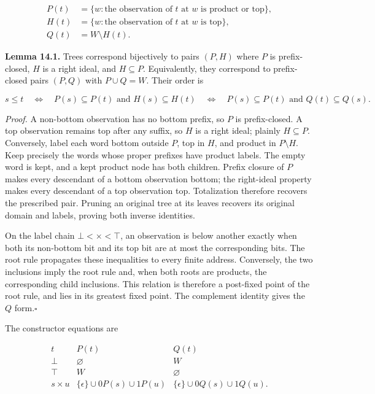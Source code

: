 \documentclass[
  11pt,
  a4paper,
]{article}
\begin{document}
\[\begin{aligned}
P(t)&=\{w:\text{the observation of }t\text{ at }w\text{ is product or top}\},\\
H(t)&=\{w:\text{the observation of }t\text{ at }w\text{ is top}\},\\
Q(t)&=W\setminus H(t).
\end{aligned}\]


\textbf{Lemma 14.1.} Trees correspond bijectively to pairs \((P,H)\)
where \(P\) is prefix-closed, \(H\) is a right ideal, and
\(H\subseteq P\). Equivalently, they correspond to prefix-closed pairs
\((P,Q)\) with \(P\cup Q=W\). Their order is

\[s\le t\quad\Longleftrightarrow\quad
P(s)\subseteq P(t)\text{ and }H(s)\subseteq H(t)
\quad\Longleftrightarrow\quad
P(s)\subseteq P(t)\text{ and }Q(t)\subseteq Q(s). \tag{14.1}\]

\emph{Proof.} A non-bottom observation has no bottom prefix, so \(P\) is
prefix-closed. A top observation remains top after any suffix, so \(H\)
is a right ideal; plainly \(H\subseteq P\). Conversely, label each word
bottom outside \(P\), top in \(H\), and product in \(P\setminus H\).
Keep precisely the words whose proper prefixes have product labels. The
empty word is kept, and a kept product node has both children. Prefix
closure of \(P\) makes every descendant of a bottom observation bottom;
the right-ideal property makes every descendant of a top observation
top. Totalization therefore recovers the prescribed pair. Pruning an
original tree at its leaves recovers its original domain and labels,
proving both inverse identities.

On the label chain \(\bot<\times<\top\), an observation is below another
exactly when both its non-bottom bit and its top bit are at most the
corresponding bits. The root rule propagates these inequalities to every
finite address. Conversely, the two inclusions imply the root rule and,
when both roots are products, the corresponding child inclusions. This
relation is therefore a post-fixed point of the root rule, and lies in
its greatest fixed point. The complement identity gives the \(Q\)
form.\nobreak\hspace{.5em}\(\square\)

The constructor equations are

\[\begin{array}{c|cc}
t&P(t)&Q(t)\\\hline
\bot&\varnothing&W\\
\top&W&\varnothing\\
s\times u&\{\epsilon\}\cup0P(s)\cup1P(u)&
             \{\epsilon\}\cup0Q(s)\cup1Q(u).
\end{array}\]
\end{document}
